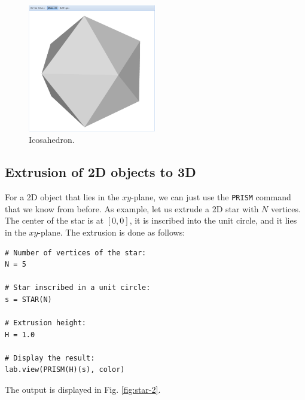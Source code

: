 \documentclass{article}
\begin{document}
\begin{figure}[!ht]
\begin{center}
\includegraphics[width=0.5\textwidth]{img/icosa.png}
\end{center}
\vspace{-2mm}
\caption{Icosahedron.}
\label{fig:icosa}
\end{figure}




\subsection{Extrusion of 2D objects to 3D}

For a 2D object that lies in the $xy$-plane, we can just 
use the {\tt PRISM} command that we know from before. As example, let us 
extrude a 2D star with $N$ vertices. The center of the star is at $[0, 0]$, 
it is inscribed into the unit circle, and it lies in the $xy$-plane. 
The extrusion is done as follows:

\begin{verbatim}
# Number of vertices of the star:
N = 5

# Star inscribed in a unit circle:
s = STAR(N)

# Extrusion height:
H = 1.0

# Display the result:
lab.view(PRISM(H)(s), color)
\end{verbatim}
The output is displayed in Fig. \ref{fig:star-2}.

\newpage
\end{document}
